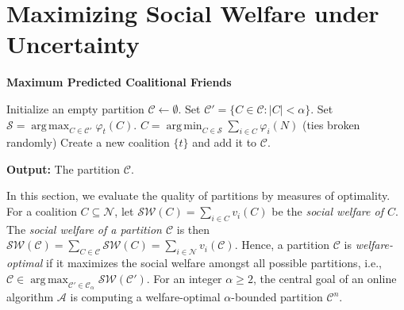 \documentclass[letterpaper]{article} %
\DeclareMathOperator*{\argmax}{arg\,max}
\DeclareMathOperator*{\argmin}{arg\,min}
\begin{document}
\section{Maximizing Social Welfare under Uncertainty}
\label{sec:Maximizing Welfare using Predictions}

\begin{algorithm}[tb]
    \caption{\textbf{Maximum Predicted Coalitional Friends}}
    \label{alg:MPCF}
    \begin{algorithmic}[1] %
        \STATE Initialize an empty partition $\mathcal{C} \leftarrow \emptyset$.
            \STATE Set $\mathcal{C}' = \{C \in \mathcal{C}: |C| < \alpha\}$.
                \STATE Set $\mathcal{S} = \argmax_{C \in \mathcal{C}'} \varphi_t(C)$.
                \STATE $C = \argmin_{C \in \mathcal{S}} \sum_{i \in C} \varphi_i(N)$ (ties broken randomly)
            \ELSE
                \STATE Create a new coalition $\{t\}$ and add it to $\mathcal{C}$.
            \ENDIF
        \ENDWHILE
    \end{algorithmic}
    \textbf{Output:} The partition $\mathcal{C}$.
\end{algorithm}

In this section, we evaluate the quality of partitions by measures of optimality. For a coalition $C \subseteq \mathcal{N}$, let $\mathcal{SW}(C) = \sum_{i \in C} v_i(C)$ be the \textit{social welfare of $C$}. The \textit{social welfare of a partition $\mathcal{C}$} is then $\mathcal{SW}(\mathcal{C}) = \sum_{C \in \mathcal{C}} \mathcal{SW}(C) = \sum_{i \in \mathcal{N}} v_i(\mathcal{C})$. Hence, a partition $\mathcal{C}$ is \textit{welfare-optimal} if it maximizes the social welfare amongst all possible partitions, i.e., $\mathcal{C} \in \argmax_{\mathcal{C}' \in \mathscr{C}_\alpha} \mathcal{SW}(\mathcal{C}')$. For an integer $\alpha \geq 2$, the central goal of an online algorithm $\mathcal{A}$ is computing a welfare-optimal $\alpha$-bounded partition $\mathcal{C}^n$.
%

%
\end{document}
